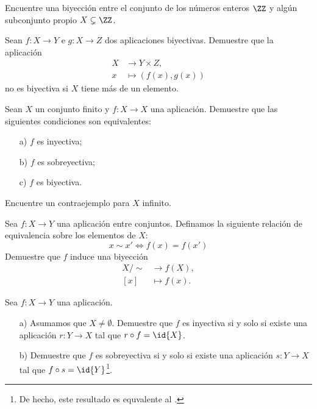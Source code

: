 \begin{ejercicio}
  Encuentre una biyección entre el conjunto de los números enteros $\ZZ$ y algún
  subconjunto propio $X \subsetneq \ZZ$.
\end{ejercicio}

\begin{ejercicio}
  Sean $f\colon X\to Y$ e $g\colon X\to Z$ dos aplicaciones
  biyectivas. Demuestre que la aplicación
  \begin{align*}
    X & \to Y\times Z,\\
    x & \mapsto (f (x), g (x))
  \end{align*}
  no es biyectiva si $X$ tiene más de un elemento.
\end{ejercicio}

\begin{ejercicio}
  Sean $X$ un conjunto finito y $f\colon X\to X$ una aplicación. Demuestre que
  las siguientes condiciones son equivalentes:
  \begin{enumerate}
  \item[a)] $f$ es inyectiva;
  \item[b)] $f$ es sobreyectiva;
  \item[c)] $f$ es biyectiva.
  \end{enumerate}
  Encuentre un contraejemplo para $X$ infinito.
\end{ejercicio}

\begin{ejercicio}
  Sea $f\colon X\to Y$ una aplicación entre conjuntos. Definamos la siguiente
  relación de equivalencia sobre los elementos de $X$:
  $$x \sim x' \iff f (x) = f (x')$$
  Demuestre que $f$ induce una biyección
  \begin{align*}
    X/\!\sim & \to f (X),\\
    {}[x] & \mapsto f (x).
  \end{align*}
\end{ejercicio}

\begin{ejercicio}
  Sea $f\colon X\to Y$ una aplicación.

  \begin{enumerate}
  \item[a)] Asumamos que $X \ne \emptyset$. Demuestre que $f$ es inyectiva si y
    solo si existe una aplicación $r\colon Y\to X$ tal que $r\circ f = \id{X}$.

  \item[b)] Demuestre que $f$ es sobreyectiva si y solo si existe una aplicación
    $s\colon Y\to X$ tal que $f\circ s = \id{Y}$\footnote{De hecho, este
      resultado es equvalente al .}.
  \end{enumerate}
\end{ejercicio}
